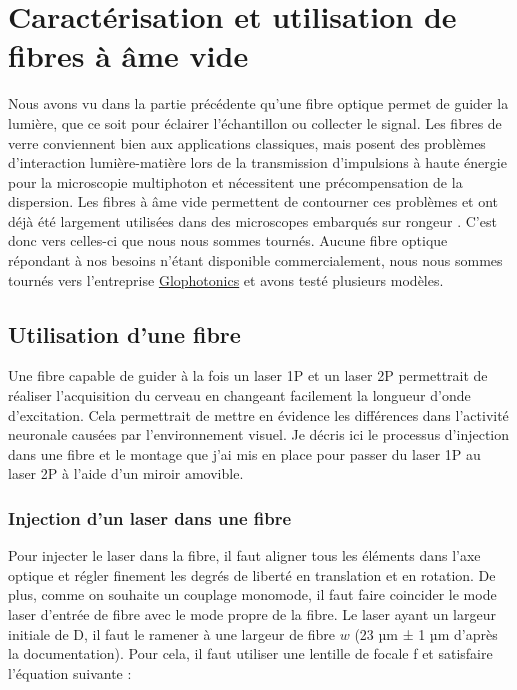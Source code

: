 \section{Caractérisation et utilisation de fibres à âme vide}

Nous avons vu dans la partie précédente qu'une fibre optique permet de guider la lumière, que ce soit pour éclairer l'échantillon ou collecter le signal. Les fibres de verre conviennent bien aux applications classiques, mais posent des problèmes d'interaction lumière-matière lors de la transmission d'impulsions à haute énergie pour la microscopie multiphoton et nécessitent une précompensation de la dispersion. Les fibres à âme vide permettent de contourner ces problèmes et ont déjà été largement utilisées dans des microscopes embarqués sur rongeur \cite{tai_two-photon_2004} \cite{flusberg_vivo_2005} \cite{engelbrecht_ultra-compact_2008} \cite{piyawattanametha_vivo_2009} \cite{choi_improving_2014} \cite{klioutchnikov_three-photon_2020}. C'est donc vers celles-ci que nous nous sommes tournés. Aucune fibre optique répondant à nos besoins n'étant disponible commercialement, nous nous sommes tournés vers l'entreprise \href{http://www.glophotonics.fr/}{Glophotonics} et avons testé plusieurs modèles.

\subsection{Utilisation d'une fibre}


Une fibre capable de guider à la fois un laser 1P et un laser 2P permettrait de réaliser l'acquisition du cerveau en changeant facilement la longueur d'onde d'excitation. Cela permettrait de mettre en évidence les différences dans l'activité neuronale causées par l'environnement visuel. Je décris ici le processus d'injection dans une fibre et le montage que j'ai mis en place pour passer du laser 1P au laser 2P à l'aide d'un miroir amovible. 

\subsubsection{Injection d'un laser dans une fibre}

Pour injecter le laser dans la fibre, il faut aligner tous les éléments dans l'axe optique et régler finement les degrés de liberté en translation et en rotation. De plus, comme on souhaite un couplage monomode, il faut faire coincider le mode laser d'entrée de fibre avec le mode propre de la fibre. Le laser ayant un largeur initiale de D, il faut le ramener à une largeur de fibre $w$ (23 µm ± 1 µm d'après la documentation). Pour cela, il faut utiliser une lentille de focale f et satisfaire l'équation suivante :

